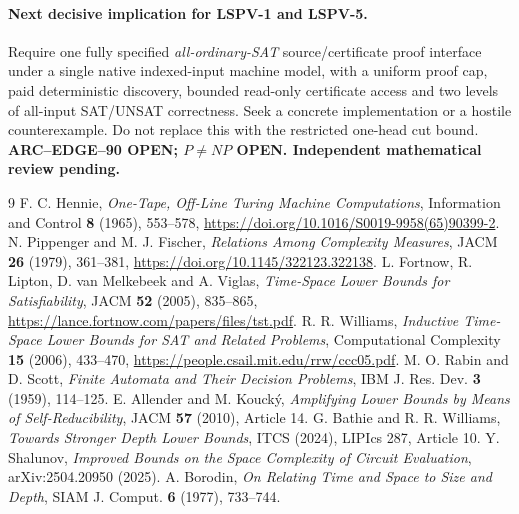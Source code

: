 \documentclass[11pt]{article}
\begin{document}
\paragraph{Next decisive implication for LSPV-1 and LSPV-5.}
Require one fully specified \emph{all-ordinary-SAT}
source/certificate proof interface under a single native
indexed-input machine model, with a uniform proof cap,
paid deterministic discovery, bounded read-only
certificate access and two levels of all-input SAT/UNSAT
correctness. Seek a concrete implementation or a hostile
counterexample. Do not replace this with the restricted
one-head cut bound. \textbf{ARC--EDGE--90 OPEN;
$P\ne NP$ OPEN. Independent mathematical review pending.}

\begin{thebibliography}{9}
 F. C. Hennie,
\emph{One-Tape, Off-Line Turing Machine Computations},
Information and Control \textbf{8} (1965), 553--578,
\url{https://doi.org/10.1016/S0019-9958(65)90399-2}.
 N. Pippenger and M. J. Fischer,
\emph{Relations Among Complexity Measures}, JACM
\textbf{26} (1979), 361--381,
\url{https://doi.org/10.1145/322123.322138}.
 L. Fortnow, R. Lipton, D. van Melkebeek
and A. Viglas, \emph{Time-Space Lower Bounds for
Satisfiability}, JACM \textbf{52} (2005), 835--865,
\url{https://lance.fortnow.com/papers/files/tst.pdf}.
 R. R. Williams,
\emph{Inductive Time-Space Lower Bounds for SAT and
Related Problems}, Computational Complexity \textbf{15}
(2006), 433--470,
\url{https://people.csail.mit.edu/rrw/ccc05.pdf}.
 M. O. Rabin and D. Scott,
\emph{Finite Automata and Their Decision Problems},
IBM J. Res. Dev. \textbf{3} (1959), 114--125.
 E. Allender and M. Kouck\'y,
\emph{Amplifying Lower Bounds by Means of
Self-Reducibility}, JACM \textbf{57} (2010), Article 14.
 G. Bathie and R. R. Williams,
\emph{Towards Stronger Depth Lower Bounds},
ITCS (2024), LIPIcs 287, Article 10.
 Y. Shalunov,
\emph{Improved Bounds on the Space Complexity of
Circuit Evaluation}, arXiv:2504.20950 (2025).
 A. Borodin,
\emph{On Relating Time and Space to Size and Depth},
SIAM J. Comput. \textbf{6} (1977), 733--744.
\end{thebibliography}
\end{document}
